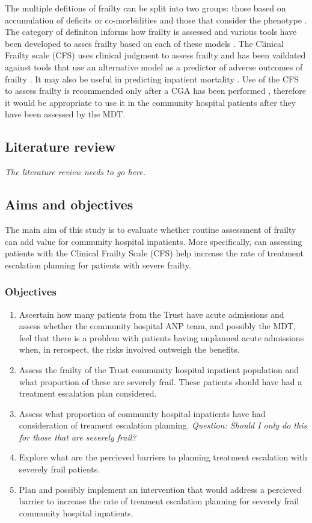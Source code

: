 \documentclass[12pt,a4paper,oneside,titlepage]{article}
\begin{document}
The multiple defitions of frailty can be split into two groups: those based on accumulation 
of deficits or co-morbidities and those that consider the phenotype \parencite{shamliyan:13}. 
The category of definiton informs how frailty is assessed and various tools have been developed
to asses frailty based on each of these models \parencite{clegg:13}.
The Clinical Frailty scale (CFS) \parencite{dalhousie:15} uses clinical judgment 
to assess frailty and has been vaildated
against tools that use an alternative model as a predictor of adverse outcomes 
of frailty \parencite{rockwood:05}. It may also be useful in predicting
inpatient mortality \parencite{wallis:15}.
Use of the CFS to
assess frailty is recommended only after a CGA has been performed \parencite{bgs:14}, therefore
it would be appropriate to use it in the community hospital patients after they
have been assessed by the MDT.

\subsection*{Literature review}
\emph{The literature review needs to go here.}

\subsection*{Aims and objectives}
The main aim of this study is to evaluate whether routine assessment of
frailty can add value for community hospital inpatients.
More specifically, can assessing patients with the Clinical Frailty Scale (CFS)
help increase the rate of 
treatment escalation planning for patients with severe frailty. 

\subsubsection*{Objectives}
\begin{enumerate}
\item Ascertain how many patients from the Trust have acute admissions and assess 
	whether the community hospital ANP team, and possibly the MDT, 
	feel that there is a  problem with patients 
	having unplanned acute admissions when, in rerospect, the risks involved
	outweigh the benefits.
\item Assess the frailty of the Trust community hospital inpatient population
	and what proportion of these are severely frail.
	These patients should have had a treatment escalation plan considered.
\item Assess what proportion of community hospital inpatients have had consideration
	of treament escalation planning. 
	\emph{Question: Should I only do this for those that are severely frail?}
\item Explore what are the percieved barriers to planning treatment escalation
	with severely frail patients.
\item Plan and possibly implement an intervention that would address a percieved
	barrier to increase the rate of treament escalation planning for severely frail
	community hospital inpatients.


\end{enumerate}
\end{document}
